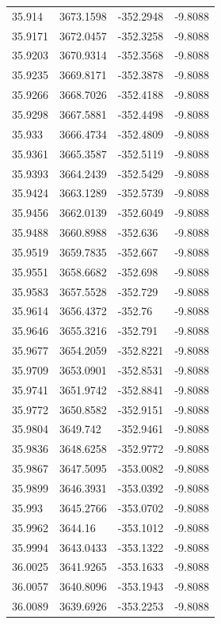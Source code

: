 \begin{table}[H]
\begin{tabular}{llll}
35.914 & 3673.1598 & -352.2948 & -9.8088 \\
35.9171 & 3672.0457 & -352.3258 & -9.8088 \\
35.9203 & 3670.9314 & -352.3568 & -9.8088 \\
35.9235 & 3669.8171 & -352.3878 & -9.8088 \\
35.9266 & 3668.7026 & -352.4188 & -9.8088 \\
35.9298 & 3667.5881 & -352.4498 & -9.8088 \\
35.933 & 3666.4734 & -352.4809 & -9.8088 \\
35.9361 & 3665.3587 & -352.5119 & -9.8088 \\
35.9393 & 3664.2439 & -352.5429 & -9.8088 \\
35.9424 & 3663.1289 & -352.5739 & -9.8088 \\
35.9456 & 3662.0139 & -352.6049 & -9.8088 \\
35.9488 & 3660.8988 & -352.636 & -9.8088 \\
35.9519 & 3659.7835 & -352.667 & -9.8088 \\
35.9551 & 3658.6682 & -352.698 & -9.8088 \\
35.9583 & 3657.5528 & -352.729 & -9.8088 \\
35.9614 & 3656.4372 & -352.76 & -9.8088 \\
35.9646 & 3655.3216 & -352.791 & -9.8088 \\
35.9677 & 3654.2059 & -352.8221 & -9.8088 \\
35.9709 & 3653.0901 & -352.8531 & -9.8088 \\
35.9741 & 3651.9742 & -352.8841 & -9.8088 \\
35.9772 & 3650.8582 & -352.9151 & -9.8088 \\
35.9804 & 3649.742 & -352.9461 & -9.8088 \\
35.9836 & 3648.6258 & -352.9772 & -9.8088 \\
35.9867 & 3647.5095 & -353.0082 & -9.8088 \\
35.9899 & 3646.3931 & -353.0392 & -9.8088 \\
35.993 & 3645.2766 & -353.0702 & -9.8088 \\
35.9962 & 3644.16 & -353.1012 & -9.8088 \\
35.9994 & 3643.0433 & -353.1322 & -9.8088 \\
36.0025 & 3641.9265 & -353.1633 & -9.8088 \\
36.0057 & 3640.8096 & -353.1943 & -9.8088 \\
36.0089 & 3639.6926 & -353.2253 & -9.8088 \\

\end{tabular}
\end{table}
